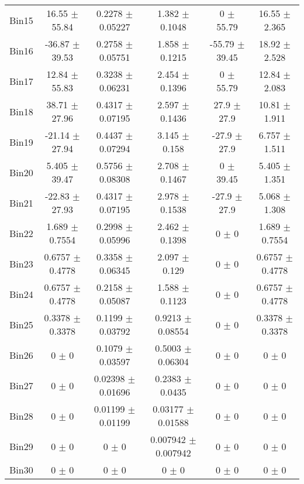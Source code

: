 \begin{tabular}{@{\extracolsep{4pt}}lccccc@{}}
     Bin15 & 16.55 $\pm$ 55.84 & 0.2278 $\pm$ 0.05227 & 1.382 $\pm$ 0.1048 & 0 $\pm$ 55.79 & 16.55 $\pm$ 2.365 \\ 
     Bin16 & -36.87 $\pm$ 39.53 & 0.2758 $\pm$ 0.05751 & 1.858 $\pm$ 0.1215 & -55.79 $\pm$ 39.45 & 18.92 $\pm$ 2.528 \\ 
     Bin17 & 12.84 $\pm$ 55.83 & 0.3238 $\pm$ 0.06231 & 2.454 $\pm$ 0.1396 & 0 $\pm$ 55.79 & 12.84 $\pm$ 2.083 \\ 
     Bin18 & 38.71 $\pm$ 27.96 & 0.4317 $\pm$ 0.07195 & 2.597 $\pm$ 0.1436 & 27.9 $\pm$ 27.9 & 10.81 $\pm$ 1.911 \\ 
     Bin19 & -21.14 $\pm$ 27.94 & 0.4437 $\pm$ 0.07294 & 3.145 $\pm$ 0.158 & -27.9 $\pm$ 27.9 & 6.757 $\pm$ 1.511 \\ 
     Bin20 & 5.405 $\pm$ 39.47 & 0.5756 $\pm$ 0.08308 & 2.708 $\pm$ 0.1467 & 0 $\pm$ 39.45 & 5.405 $\pm$ 1.351 \\ 
     Bin21 & -22.83 $\pm$ 27.93 & 0.4317 $\pm$ 0.07195 & 2.978 $\pm$ 0.1538 & -27.9 $\pm$ 27.9 & 5.068 $\pm$ 1.308 \\ 
     Bin22 & 1.689 $\pm$ 0.7554 & 0.2998 $\pm$ 0.05996 & 2.462 $\pm$ 0.1398 & 0 $\pm$ 0 & 1.689 $\pm$ 0.7554 \\ 
     Bin23 & 0.6757 $\pm$ 0.4778 & 0.3358 $\pm$ 0.06345 & 2.097 $\pm$ 0.129 & 0 $\pm$ 0 & 0.6757 $\pm$ 0.4778 \\ 
     Bin24 & 0.6757 $\pm$ 0.4778 & 0.2158 $\pm$ 0.05087 & 1.588 $\pm$ 0.1123 & 0 $\pm$ 0 & 0.6757 $\pm$ 0.4778 \\ 
     Bin25 & 0.3378 $\pm$ 0.3378 & 0.1199 $\pm$ 0.03792 & 0.9213 $\pm$ 0.08554 & 0 $\pm$ 0 & 0.3378 $\pm$ 0.3378 \\ 
     Bin26 & 0 $\pm$ 0 & 0.1079 $\pm$ 0.03597 & 0.5003 $\pm$ 0.06304 & 0 $\pm$ 0 & 0 $\pm$ 0 \\ 
     Bin27 & 0 $\pm$ 0 & 0.02398 $\pm$ 0.01696 & 0.2383 $\pm$ 0.0435 & 0 $\pm$ 0 & 0 $\pm$ 0 \\ 
     Bin28 & 0 $\pm$ 0 & 0.01199 $\pm$ 0.01199 & 0.03177 $\pm$ 0.01588 & 0 $\pm$ 0 & 0 $\pm$ 0 \\ 
     Bin29 & 0 $\pm$ 0 & 0 $\pm$ 0 & 0.007942 $\pm$ 0.007942 & 0 $\pm$ 0 & 0 $\pm$ 0 \\ 
     Bin30 & 0 $\pm$ 0 & 0 $\pm$ 0 & 0 $\pm$ 0 & 0 $\pm$ 0 & 0 $\pm$ 0 \\ 
\hline\hline
  \end{tabular}
